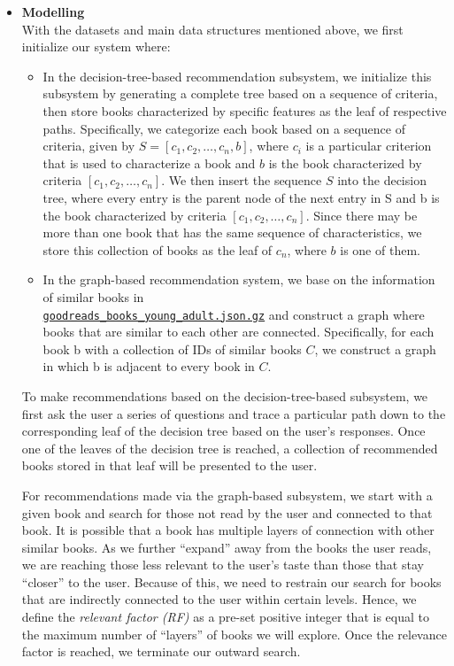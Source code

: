\documentclass[fontsize=11pt]{article}
\begin{document}
\begin{itemize}
\item \textbf{Modelling}\\
With the datasets and main data structures mentioned above, we first initialize our system where:
\begin{itemize}
\item In the decision-tree-based recommendation subsystem, we initialize this subsystem by generating a complete tree based on a sequence of criteria, then store books characterized by specific features as the leaf of respective paths. Specifically, we categorize each book based on a sequence of criteria, given by $S = [c_1, c_2, …, c_n, b]$, where $c_i$ is a particular criterion that is used to characterize a book and $b$ is the book characterized by criteria $[c_1, c_2, …, c_n]$. We then insert the sequence $S$ into the decision tree, where every entry is the parent node of the next entry in S and b is the book characterized by criteria  $[c_1, c_2, …, c_n]$. Since there may be more than one book that has the same sequence of characteristics, we store this collection of books as the leaf of $c_n$, where $b$ is one of them.
\item  In the graph-based recommendation system, we base on the information of similar books in \\\texttt{\href{https://drive.google.com/uc?id=1gH7dG4yQzZykTpbHYsrw2nFknjUm0Mol}{goodreads\_books\_young\_adult.json.gz}} and construct a graph where books that are similar to each other are connected. Specifically, for each book b with a collection of IDs of similar books $C$, we construct a graph in which b is adjacent to every book in $C$. \\
\end{itemize}
To make recommendations based on the decision-tree-based subsystem, we first ask the user a series of questions and trace a particular path down to the corresponding leaf of the decision tree based on the user’s responses. Once one of the leaves of the decision tree is reached, a collection of recommended books stored in that leaf will be presented to the user.

For recommendations made via the graph-based subsystem, we start with a given book and search for those not read by the user and connected to that book. It is possible that a book has multiple layers of connection with other similar books. As we further “expand” away from the books the user reads, we are reaching those less relevant to the user’s taste than those that stay “closer” to the user. Because of this, we need to restrain our search for books that are indirectly connected to the user within certain levels. Hence, we define the \textit{relevant factor (RF)} as a pre-set positive integer that is equal to the maximum number of “layers” of books we will explore. Once the relevance factor is reached, we terminate our outward search.


\end{itemize}
\end{document}
